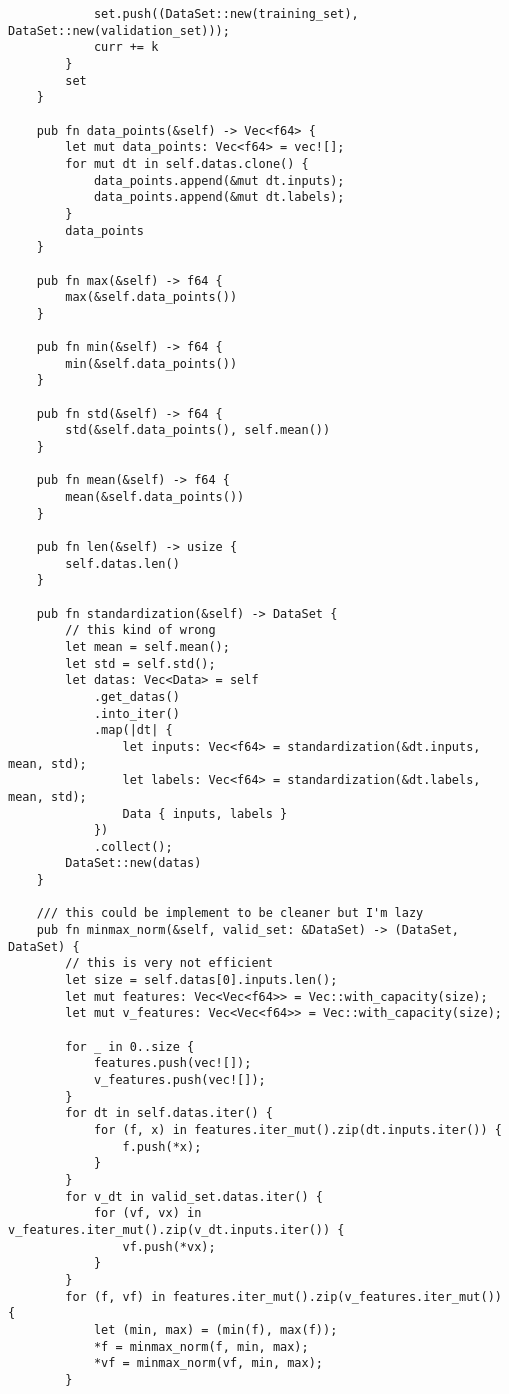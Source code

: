 \begin{code}
\begin{verbatim}
            set.push((DataSet::new(training_set), DataSet::new(validation_set)));
            curr += k
        }
        set
    }

    pub fn data_points(&self) -> Vec<f64> {
        let mut data_points: Vec<f64> = vec![];
        for mut dt in self.datas.clone() {
            data_points.append(&mut dt.inputs);
            data_points.append(&mut dt.labels);
        }
        data_points
    }

    pub fn max(&self) -> f64 {
        max(&self.data_points())
    }

    pub fn min(&self) -> f64 {
        min(&self.data_points())
    }

    pub fn std(&self) -> f64 {
        std(&self.data_points(), self.mean())
    }

    pub fn mean(&self) -> f64 {
        mean(&self.data_points())
    }

    pub fn len(&self) -> usize {
        self.datas.len()
    }

    pub fn standardization(&self) -> DataSet {
        // this kind of wrong
        let mean = self.mean();
        let std = self.std();
        let datas: Vec<Data> = self
            .get_datas()
            .into_iter()
            .map(|dt| {
                let inputs: Vec<f64> = standardization(&dt.inputs, mean, std);
                let labels: Vec<f64> = standardization(&dt.labels, mean, std);
                Data { inputs, labels }
            })
            .collect();
        DataSet::new(datas)
    }

    /// this could be implement to be cleaner but I'm lazy
    pub fn minmax_norm(&self, valid_set: &DataSet) -> (DataSet, DataSet) {
        // this is very not efficient
        let size = self.datas[0].inputs.len();
        let mut features: Vec<Vec<f64>> = Vec::with_capacity(size);
        let mut v_features: Vec<Vec<f64>> = Vec::with_capacity(size);

        for _ in 0..size {
            features.push(vec![]);
            v_features.push(vec![]);
        }
        for dt in self.datas.iter() {
            for (f, x) in features.iter_mut().zip(dt.inputs.iter()) {
                f.push(*x);
            }
        }
        for v_dt in valid_set.datas.iter() {
            for (vf, vx) in v_features.iter_mut().zip(v_dt.inputs.iter()) {
                vf.push(*vx);
            }
        }
        for (f, vf) in features.iter_mut().zip(v_features.iter_mut()) {
            let (min, max) = (min(f), max(f));
            *f = minmax_norm(f, min, max);
            *vf = minmax_norm(vf, min, max);
        }


\end{verbatim}
\end{code}
